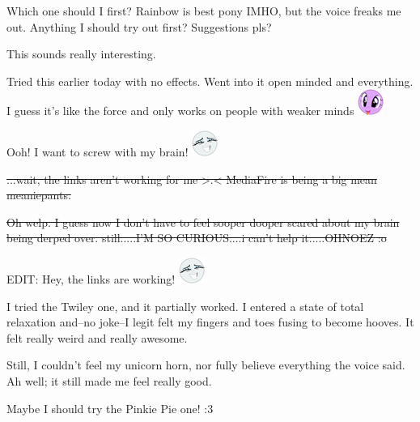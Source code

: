 \documentclass[ebook,12pt,oneside,openany]{memoir}
\begin{document}
\begin{tcolorbox}[title=suclearnub]
\par{Which one should I first? Rainbow is best pony IMHO, but the voice freaks me out. Anything I should try out first? Suggestions pls?}
\par{This sounds really interesting.}
\end{tcolorbox}
\begin{tcolorbox}[title=Bucky McGillyCuddy]
\par{Tried this earlier today with no effects. Went into it open minded and everything. I guess it's like the force and only works on people with weaker minds \includegraphics{images/mlp_eW9KEfP.png}}
\end{tcolorbox}
\begin{tcolorbox}[title=The Late Night Shine]
\par{Ooh! I want to screw with my brain! \includegraphics{images/mlp_8pfRZzv.png}}
\newline{}
\par{\sout{...wait, the links aren't working for me >.< MediaFire is being a big mean meaniepants.}}
\newline{}
\par{\sout{Oh welp. I guess now I don't have to feel sooper dooper scared about my brain being derped over. still.....I'M SO CURIOUS....i can't help it.....OHNOEZ :o}}
\newline{}
\par{EDIT: Hey, the links are working! \includegraphics{images/mlp_8pfRZzv.png}}
\newline{}
\par{I tried the Twiley one, and it partially worked. I entered a state of total relaxation and--no joke--I legit felt my fingers and toes fusing to become hooves. It felt really weird and really awesome.}
\par{Still, I couldn't feel my unicorn horn, nor fully believe everything the voice said. Ah well; it still made me feel really good.}
\newline{}
\par{Maybe I should try the Pinkie Pie one! :3}
\end{tcolorbox}
\end{document}
